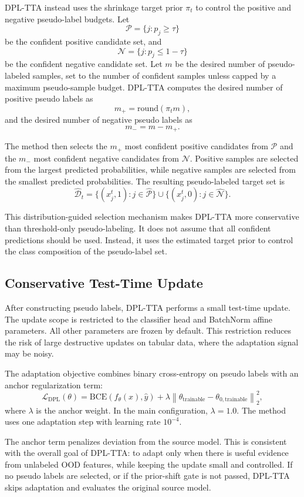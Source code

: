 DPL-TTA instead uses the shrinkage target prior $\pi_t$ to control the positive and negative pseudo-label budgets. Let
\[
\mathcal{P} = \{j : p_j \geq \tau\}
\]
be the confident positive candidate set, and
\[
\mathcal{N} = \{j : p_j \leq 1-\tau\}
\]
be the confident negative candidate set. Let $m$ be the desired number of pseudo-labeled samples, set to the number of confident samples unless capped by a maximum pseudo-sample budget. DPL-TTA computes the desired number of positive pseudo labels as
\[
m_+ = \mathrm{round}(\pi_t m),
\]
and the desired number of negative pseudo labels as
\[
m_- = m - m_+.
\]

The method then selects the $m_+$ most confident positive candidates from $\mathcal{P}$ and the $m_-$ most confident negative candidates from $\mathcal{N}$. Positive samples are selected from the largest predicted probabilities, while negative samples are selected from the smallest predicted probabilities. The resulting pseudo-labeled target set is
\[
\hat{\mathcal{D}}_t =
\{(x_j^t, 1): j \in \hat{\mathcal{P}}\}
\cup
\{(x_j^t, 0): j \in \hat{\mathcal{N}}\}.
\]

This distribution-guided selection mechanism makes DPL-TTA more conservative than threshold-only pseudo-labeling. It does not assume that all confident predictions should be used. Instead, it uses the estimated target prior to control the class composition of the pseudo-label set.

\subsection{Conservative Test-Time Update}

After constructing pseudo labels, DPL-TTA performs a small test-time update. The update scope is restricted to the classifier head and BatchNorm affine parameters. All other parameters are frozen by default. This restriction reduces the risk of large destructive updates on tabular data, where the adaptation signal may be noisy.

The adaptation objective combines binary cross-entropy on pseudo labels with an anchor regularization term:
\[
\mathcal{L}_{\mathrm{DPL}}(\theta)
=
\mathrm{BCE}(f_\theta(x), \hat{y})
+
\lambda
\left\|
\theta_{\mathrm{trainable}} -
\theta_{0,\mathrm{trainable}}
\right\|_2^2,
\]
where $\lambda$ is the anchor weight. In the main configuration, $\lambda=1.0$. The method uses one adaptation step with learning rate $10^{-4}$.

The anchor term penalizes deviation from the source model. This is consistent with the overall goal of DPL-TTA: to adapt only when there is useful evidence from unlabeled OOD features, while keeping the update small and controlled. If no pseudo labels are selected, or if the prior-shift gate is not passed, DPL-TTA skips adaptation and evaluates the original source model.

